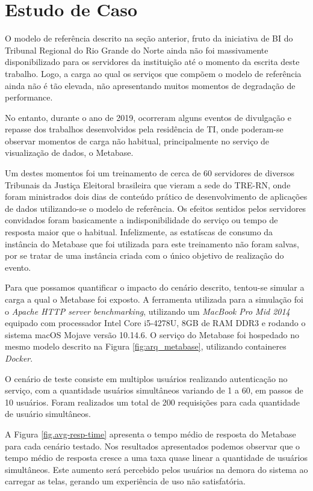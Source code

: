 \section{Estudo de Caso}

O modelo de referência descrito na seção anterior, fruto da iniciativa de BI do Tribunal Regional do Rio Grande do Norte ainda não foi massivamente disponibilizado para os servidores da instituição até o momento da escrita deste trabalho. Logo, a carga ao qual os serviços que compõem o modelo de referência ainda não é tão elevada, não apresentando muitos momentos de degradação de performance.

No entanto, durante o ano de 2019, ocorreram alguns eventos de divulgação e repasse dos trabalhos desenvolvidos pela residência de TI, onde poderam-se observar momentos de carga não habitual, principalmente no serviço de visualização de dados, o Metabase.

Um destes momentos foi um treinamento de cerca de 60 servidores de diversos Tribunais da Justiça Eleitoral brasileira que vieram a sede do TRE-RN, onde foram ministrados dois dias de conteúdo prático de desenvolvimento de aplicações de dados utilizando-se o modelo de referência. Os efeitos sentidos pelos servidores convidados foram basicamente a indisponibilidade do serviço ou tempo de resposta maior que o habitual. Infelizmente, as estatíscas de consumo da instância do Metabase que foi utilizada para este treinamento não foram salvas, por se tratar de uma instância criada com o único objetivo de realização do evento. 

Para que possamos quantificar o impacto do cenário descrito, tentou-se simular a carga a qual o Metabase foi exposto. A ferramenta utilizada para a simulação foi o \textit{Apache HTTP server benchmarking}, utilizando um \textit{MacBook Pro Mid 2014} equipado com processador Intel Core i5-4278U, 8GB de RAM DDR3 e rodando o sistema macOS Mojave versão 10.14.6. O serviço do Metabase foi hospedado no mesmo modelo descrito na Figura \ref{fig:arq_metabase}, utilizando containeres \textit{Docker}. 

O cenário de teste consiste em multiplos usuários realizando autenticação no serviço, com a quantidade usuários simultâneos variando de 1 a 60, em passos de 10 usuários. Foram realizados um total de 200 requisições para cada quantidade de usuário simultâneos. 

A Figura \ref{fig.avg-resp-time} apresenta o tempo médio de resposta do Metabase para cada cenário testado. Nos resultados apresentados podemos observar que o tempo médio de resposta cresce a uma taxa quase linear a quantidade de usuários simultâneos. Este aumento será percebido pelos usuários na demora do sistema ao carregar as telas, gerando um experiência de uso não satisfatória. 

